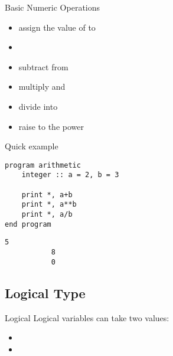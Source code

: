 \begin{frame}
  \begin{block}{Basic Numeric Operations}\pause
  \begin{itemize}
    \item {} {assign the value of  to }
    \item {}
    \item {} {subtract  from }
    \item {} {multiply  and }
    \item {} {divide  into }
    \item {} {raise  to the power }
  \end{itemize}
  \end{block}
\end{frame}


\begin{frame}[fragile]
  \begin{block}{Quick example}\pause
\begin{lstlisting}
program arithmetic
    integer :: a = 2, b = 3

    print *, a+b
    print *, a**b
    print *, a/b
end program
\end{lstlisting}
\begin{lstlisting}[language=shl]
           5
           8
           0
\end{lstlisting}
  \end{block}
\end{frame}



\subsection{Logical Type}

\begin{frame}
  \begin{block}{Logical}\pause
  Logical variables can take two values:
  \begin{itemize}
    \item {}
    \item {}
  \end{itemize}
  \end{block}
\end{frame}

